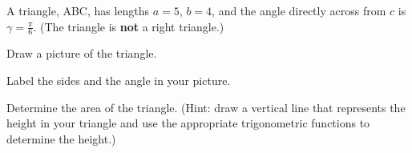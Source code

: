 
\begin{problem}
\item A triangle, ABC, has lengths $a=5$, $b=4$, and the angle
  directly across from $c$ is $\gamma=\frac{\pi}{6}$.
  (The triangle is \textbf{not} a right triangle.)
  \begin{subproblem}
  \item Draw a picture of the triangle.
    \vfill
  \item Label the sides and the angle in your picture.
  \item Determine the area of the triangle. (Hint: draw a vertical
    line that represents the height in your triangle and use the
    appropriate trigonometric functions to determine the height.)
    \vfill
  \end{subproblem}
\end{problem}


